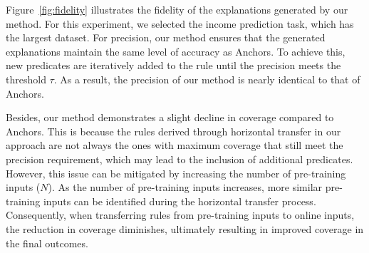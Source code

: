 Figure~\ref{fig:fidelity} illustrates the fidelity of the explanations generated by our method. For this experiment, we selected the income prediction task, which has the largest dataset. For precision, our method ensures that the generated explanations maintain the same level of accuracy as Anchors. To achieve this, new predicates are iteratively added to the rule until the precision meets the threshold \(\tau\). As a result, the precision of our method is nearly identical to that of Anchors.

Besides, our method demonstrates a slight decline in coverage compared to Anchors. This is because the rules derived through horizontal transfer in our approach are not always the ones with maximum coverage that still meet the precision requirement, which may lead to the inclusion of additional predicates. However, this issue can be mitigated by increasing the number of pre-training inputs (\(N\)). As the number of pre-training inputs increases, more similar pre-training inputs can be identified during the horizontal transfer process. Consequently, when transferring rules from pre-training inputs to online inputs, the reduction in coverage diminishes, ultimately resulting in improved coverage in the final outcomes.
